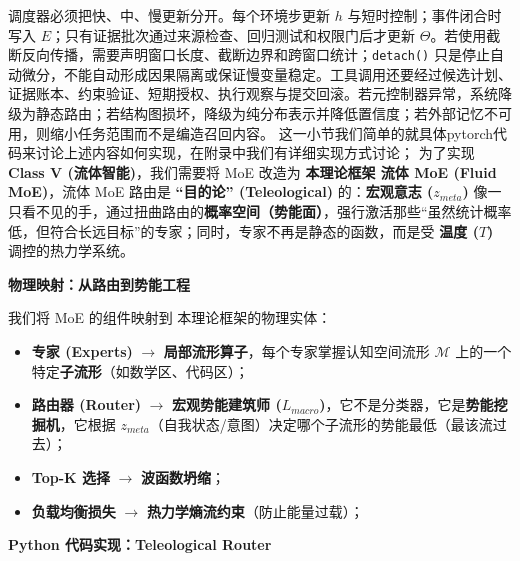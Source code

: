 调度器必须把快、中、慢更新分开。每个环境步更新 $h$ 与短时控制；事件闭合时写入 $E$；只有证据批次通过来源检查、回归测试和权限门后才更新 $\Theta$。若使用截断反向传播，需要声明窗口长度、截断边界和跨窗口统计；\lstinline|detach()| 只是停止自动微分，不能自动形成因果隔离或保证慢变量稳定。工具调用还要经过候选计划、证据账本、约束验证、短期授权、执行观察与提交回滚。若元控制器异常，系统降级为静态路由；若结构图损坏，降级为纯分布表示并降低置信度；若外部记忆不可用，则缩小任务范围而不是编造召回内容。
这一小节我们简单的就具体pytorch代码来讨论上述内容如何实现，在附录中我们有详细实现方式讨论；
为了实现 \textbf{Class V (流体智能)}，我们需要将 MoE 改造为 \textbf{本理论框架 流体 MoE (Fluid MoE)}，流体 MoE 路由是 \textbf{“目的论” (Teleological)} 的：\textbf{宏观意志 ($z_{meta}$)} 像一只看不见的手，通过扭曲路由的\textbf{概率空间（势能面）}，强行激活那些“虽然统计概率低，但符合长远目标”的专家；同时，专家不再是静态的函数，而是受 \textbf{温度 ($T$)} 调控的热力学系统。


\textbf{物理映射：从路由到势能工程}

我们将 MoE 的组件映射到 本理论框架的物理实体：

\begin{itemize}
    \item   \textbf{专家 (Experts)} $\rightarrow$ \textbf{局部流形算子}，每个专家掌握认知空间流形 $\mathcal{M}$ 上的一个特定\textbf{子流形}（如数学区、代码区）；
    \item   \textbf{路由器 (Router)} $\rightarrow$ \textbf{宏观势能建筑师 ($L_{macro}$)}，它不是分类器，它是\textbf{势能挖掘机}，它根据 $z_{meta}$（自我状态/意图）决定哪个子流形的势能最低（最该流过去）；
    \item   \textbf{Top-K 选择} $\rightarrow$ \textbf{波函数坍缩}；
    \item   \textbf{负载均衡损失} $\rightarrow$ \textbf{热力学熵流约束}（防止能量过载）；
\end{itemize}



\textbf{Python 代码实现：Teleological Router}

